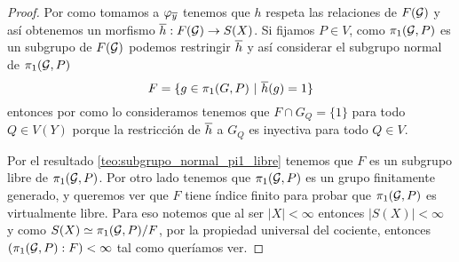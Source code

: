 \documentclass[tesis.tex]{subfiles}
\begin{document}
\begin{proof}
	Por como tomamos a $\varphi_{\overline y}$ tenemos que $h$ respeta las relaciones de $F({\cal G})$ y así obtenemos un morfismo $\overline{h}:F({\cal G}) \to S(X)$.
	Si fijamos $P \in V$, como $\pi_1({\cal G},P)$ es un subgrupo de $F({\cal G})$ podemos restringir $\overline{h}$ y así considerar el subgrupo normal de $\pi_1({\cal G}, P)$ 
	\[
	F = \{  g \in \pi_1(G,P) \ | \ \overline{h}(g) = 1  \}
	\]
	entonces por como lo consideramos tenemos que $F \cap G_Q = \{ 1 \}$ para todo $Q \in V(Y)$ porque la restricción de $\overline{h}$ a $G_Q$ es inyectiva para todo $Q \in V$.

	Por el resultado \ref{teo:subgrupo_normal_pi1_libre} tenemos que $F$ es un subgrupo libre de $\pi_1({\cal G}, P)$.
	Por otro lado tenemos que $\pi_{1}({\cal G}, P)$ es un grupo finitamente generado, y queremos ver que $F$ tiene índice finito para probar que $\pi_1({\cal G},P)$ es virtualmente libre.
	Para eso notemos que al ser $|X| < \infty$ entonces $|S(X)| < \infty$ y como $S(X) \simeq \pi_1({\cal G}, P) / F$, por la propiedad universal del cociente, entonces $(\pi_1({\cal G}, P) : F) < \infty$ tal como queríamos ver.
	
\end{proof}
\end{document}
